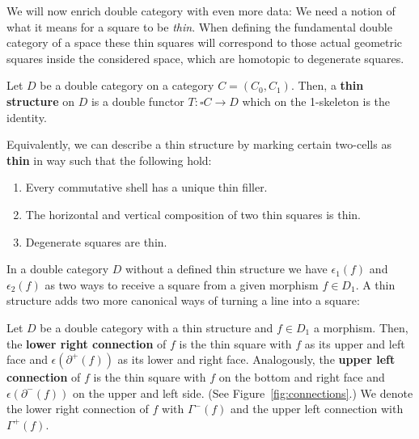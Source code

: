 We will now enrich double category with even more data: We need a notion of
what it means for a square to be \emph{thin}.
When defining the fundamental double category of a space these thin squares will
correspond to those actual geometric squares inside the considered space, which are
homotopic to degenerate squares.

\begin{defn} \label{def:thin-structure}
Let $D$ be a double category on a category $C = (C_0, C_1)$. Then, a \textbf{thin
structure} on $D$ is a double functor $T : \square C \to D$ which on the 1-skeleton
is the identity.

Equivalently, we can describe a thin structure by marking certain two-cells as
\textbf{thin} in way such that the following hold:
\begin{enumerate}
\item Every commutative shell has a unique thin filler.
\item The horizontal and vertical composition of two thin squares is thin.
\item Degenerate squares are thin.
\end{enumerate}
\end{defn}

In a double category $D$ without a defined thin structure we have
$\epsilon_1(f)$ and $\epsilon_2(f)$ as two ways to receive a square from a given
morphism $f \in D_1$. A thin structure adds two more canonical ways of turning
a line into a square:

\begin{defn} \label{def:connections}
Let $D$ be a double category with a thin structure and $f \in D_1$ a morphism.
Then, the \textbf{lower right connection} of $f$ is the thin square with $f$ 
as its upper and left face and $\epsilon(\partial^+(f))$ as its lower and right face.
Analogously, the \textbf{upper left connection} of $f$ is the thin square with
$f$ on the bottom and right face and $\epsilon(\partial^-(f))$ on the upper and
left side. (See Figure~\ref{fig:connections}.)
We denote the lower right connection of $f$ with $\Gamma^-(f)$ and the upper left
connection with $\Gamma^+(f)$.
\end{defn}

